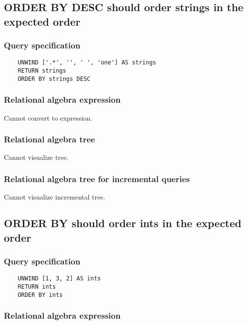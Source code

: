 	\subsection{ORDER BY DESC should order strings in the expected order}

	\subsubsection*{Query specification}

	\begin{lstlisting}
	UNWIND ['.*', '', ' ', 'one'] AS strings
	RETURN strings
	ORDER BY strings DESC
	\end{lstlisting}


	\subsubsection*{Relational algebra expression}

	Cannot convert to expression.

	\subsubsection*{Relational algebra tree}

	Cannot visualize tree.

	\subsubsection*{Relational algebra tree for incremental queries}

	Cannot visualize incremental tree.
	\subsection{ORDER BY should order ints in the expected order}

	\subsubsection*{Query specification}

	\begin{lstlisting}
	UNWIND [1, 3, 2] AS ints
	RETURN ints
	ORDER BY ints
	\end{lstlisting}


	\subsubsection*{Relational algebra expression}


